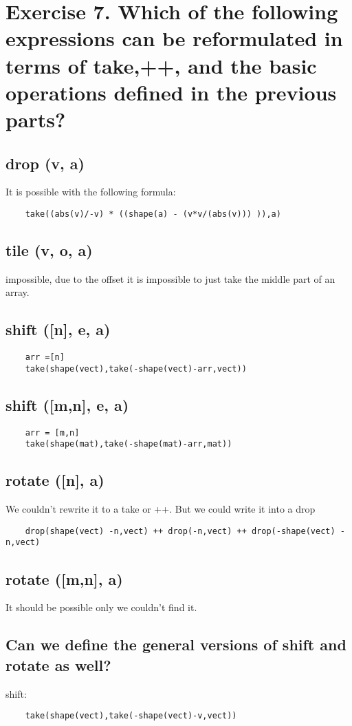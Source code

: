 \documentclass[a4paper]{article}
\begin{document}
\section*{Exercise 7. Which of the following expressions can be reformulated in terms of take,++, and the basic operations defined in the previous parts?}
\subsection*{drop (v, a)}
It is possible with the following formula: 
\begin{verbatim}
    take((abs(v)/-v) * ((shape(a) - (v*v/(abs(v))) )),a)
\end{verbatim}
\subsection*{tile (v, o, a)}
impossible, due to the offset it is impossible to just take the middle part of an array.
\subsection*{shift ([n], e, a)}
\begin{verbatim}
    arr =[n]
    take(shape(vect),take(-shape(vect)-arr,vect))
\end{verbatim}

\subsection*{shift ([m,n], e, a)}
\begin{verbatim}
    arr = [m,n]
    take(shape(mat),take(-shape(mat)-arr,mat))
\end{verbatim}

\subsection*{rotate ([n], a)}
We couldn't rewrite it to a take or ++. But we could write it into a drop
\begin{verbatim}
    drop(shape(vect) -n,vect) ++ drop(-n,vect) ++ drop(-shape(vect) -n,vect)
\end{verbatim}
\subsection*{rotate ([m,n], a)}
It should be possible only we couldn't find it.
\subsection*{Can we define the general versions of shift and rotate as well?}
shift:
\begin{verbatim}
    take(shape(vect),take(-shape(vect)-v,vect))
\end{verbatim}
\end{document}
